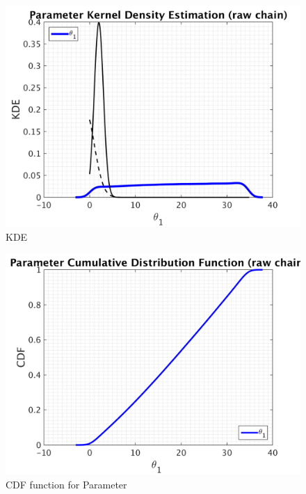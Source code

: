 \begin{figure}[h!]
  
  \centering
   \includegraphics[scale=0.75]{output_1000/simple_ip_kde_raw}
   \caption{ KDE }
\end{figure}

\begin{figure}[h!]
  
  \centering
   \includegraphics[scale=0.75]{output_1000/simple_ip_cdf_raw}
   \caption{CDF function for Parameter }
\end{figure}



